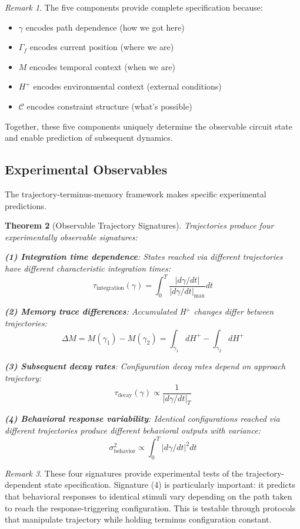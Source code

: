 \documentclass[aps,prd,twocolumn,superscriptaddress,floatfix,nofootinbib]{revtex4-2}
\newtheorem{theorem}{Theorem}[section]
\theoremstyle{remark}
\newtheorem{remark}[theorem]{Remark}
\begin{document}
\begin{remark}
The five components provide complete specification because:
\begin{itemize}
\item $\gamma$ encodes path dependence (how we got here)
\item $\Gamma_f$ encodes current position (where we are)
\item $M$ encodes temporal context (when we are)
\item $H^+$ encodes environmental context (external conditions)
\item $\mathcal{C}$ encodes constraint structure (what's possible)
\end{itemize}

Together, these five components uniquely determine the observable circuit state and enable prediction of subsequent dynamics.
\end{remark}

\subsection{Experimental Observables}

The trajectory-terminus-memory framework makes specific experimental predictions.

\begin{theorem}[Observable Trajectory Signatures]
\label{thm:observable_trajectories}
Trajectories produce four experimentally observable signatures:

\textbf{(1) Integration time dependence}: States reached via different trajectories have different characteristic integration times:
$$
\tau_{\text{integration}}(\gamma) = \int_0^T \frac{|d\gamma/dt|}{|d\gamma/dt|_{\text{max}}} dt
$$

\textbf{(2) Memory trace differences}: Accumulated H$^+$ changes differ between trajectories:
$$
\Delta M = M(\gamma_1) - M(\gamma_2) = \int_{\gamma_1} dH^+ - \int_{\gamma_2} dH^+
$$

\textbf{(3) Subsequent decay rates}: Configuration decay rates depend on approach trajectory:
$$
\tau_{\text{decay}}(\gamma) \propto \frac{1}{|d\gamma/dt|_T}
$$

\textbf{(4) Behavioral response variability}: Identical configurations reached via different trajectories produce different behavioral outputs with variance:
$$
\sigma^2_{\text{behavior}} \propto \int_0^T |d\gamma/dt|^2 dt
$$
\end{theorem}

\begin{remark}
These four signatures provide experimental tests of the trajectory-dependent state specification. Signature (4) is particularly important: it predicts that behavioral responses to identical stimuli vary depending on the path taken to reach the response-triggering configuration. This is testable through protocols that manipulate trajectory while holding terminus configuration constant.
\end{remark}
\end{document}
